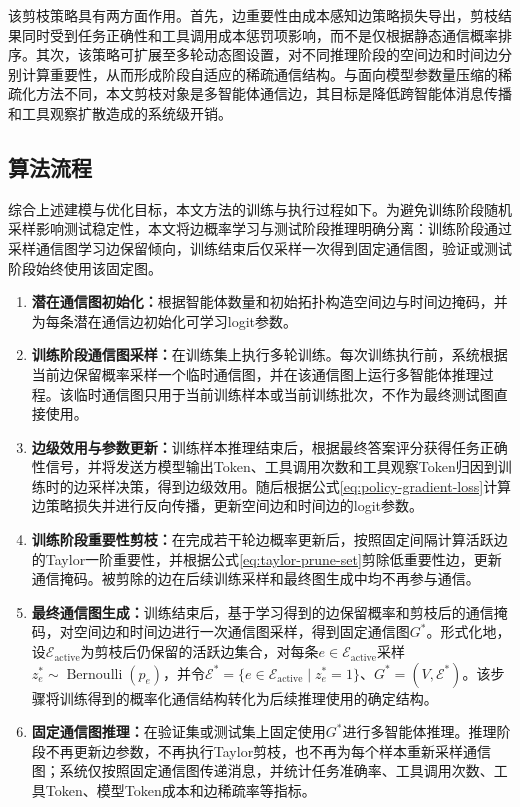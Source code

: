 该剪枝策略具有两方面作用。首先，边重要性由成本感知边策略损失导出，剪枝结果同时受到任务正确性和工具调用成本惩罚项影响，而不是仅根据静态通信概率排序。其次，该策略可扩展至多轮动态图设置，对不同推理阶段的空间边和时间边分别计算重要性，从而形成阶段自适应的稀疏通信结构。与面向模型参数量压缩的稀疏化方法不同\cite{ref108,ref109,ref110}，本文剪枝对象是多智能体通信边，其目标是降低跨智能体消息传播和工具观察扩散造成的系统级开销。

\subsection{算法流程}

综合上述建模与优化目标，本文方法的训练与执行过程如下。为避免训练阶段随机采样影响测试稳定性，本文将边概率学习与测试阶段推理明确分离：训练阶段通过采样通信图学习边保留倾向，训练结束后仅采样一次得到固定通信图，验证或测试阶段始终使用该固定图。

\begin{enumerate}[topsep=0pt,itemsep=0pt,parsep=0pt,partopsep=0pt,leftmargin=0em,itemindent=2em,label=\arabic*.]
  \item \textbf{潜在通信图初始化：}根据智能体数量和初始拓扑构造空间边与时间边掩码，并为每条潜在通信边初始化可学习logit参数。
  \item \textbf{训练阶段通信图采样：}在训练集上执行多轮训练。每次训练执行前，系统根据当前边保留概率采样一个临时通信图，并在该通信图上运行多智能体推理过程。该临时通信图只用于当前训练样本或当前训练批次，不作为最终测试图直接使用。
  \item \textbf{边级效用与参数更新：}训练样本推理结束后，根据最终答案评分获得任务正确性信号，并将发送方模型输出Token、工具调用次数和工具观察Token归因到训练时的边采样决策，得到边级效用。随后根据公式\ref{eq:policy-gradient-loss}计算边策略损失并进行反向传播，更新空间边和时间边的logit参数。
  \item \textbf{训练阶段重要性剪枝：}在完成若干轮边概率更新后，按照固定间隔计算活跃边的Taylor一阶重要性，并根据公式\ref{eq:taylor-prune-set}剪除低重要性边，更新通信掩码。被剪除的边在后续训练采样和最终图生成中均不再参与通信。
  \item \textbf{最终通信图生成：}训练结束后，基于学习得到的边保留概率和剪枝后的通信掩码，对空间边和时间边进行一次通信图采样，得到固定通信图$G^\ast$。形式化地，设$\mathcal{E}_{\mathrm{active}}$为剪枝后仍保留的活跃边集合，对每条$e\in\mathcal{E}_{\mathrm{active}}$采样$z_e^\ast\sim\operatorname{Bernoulli}(p_e)$，并令$\mathcal{E}^\ast=\{e\in\mathcal{E}_{\mathrm{active}}\mid z_e^\ast=1\}$、$G^\ast=(V,\mathcal{E}^\ast)$。该步骤将训练得到的概率化通信结构转化为后续推理使用的确定结构。
  \item \textbf{固定通信图推理：}在验证集或测试集上固定使用$G^\ast$进行多智能体推理。推理阶段不再更新边参数，不再执行Taylor剪枝，也不再为每个样本重新采样通信图；系统仅按照固定通信图传递消息，并统计任务准确率、工具调用次数、工具Token、模型Token成本和边稀疏率等指标。
\end{enumerate}

